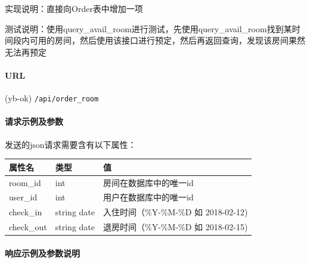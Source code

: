\documentclass[]{article}
\let\oldparagraph\paragraph
\renewcommand{\paragraph}[1]{\oldparagraph{#1}\mbox{}}
\begin{document}
实现说明：直接向Order表中增加一项

测试说明：使用query\_avail\_room进行测试，先使用query\_avail\_room找到某时间段内可用的房间，然后使用该接口进行预定，然后再返回查询，发现该房间果然无法再预定

\hypertarget{url-2}{%
\paragraph{URL}\label{url-2}}

(yb-ok) \texttt{/api/order\_room}

\hypertarget{ux8bf7ux6c42ux793aux4f8bux53caux53c2ux6570-1}{%
\paragraph{请求示例及参数}\label{ux8bf7ux6c42ux793aux4f8bux53caux53c2ux6570-1}}

\begin{Shaded}
\begin{Highlighting}[]
\FunctionTok{\{}
    \FunctionTok{:}\FunctionTok{,}
\FunctionTok{\}}
\end{Highlighting}
\end{Shaded}

发送的json请求需要含有以下属性：

\begin{longtable}[]{@{}lll@{}}
\toprule
属性名 & 类型 & 值\tabularnewline
\midrule
\endhead
room\_id & int & 房间在数据库中的唯一id\tabularnewline
user\_id & int & 用户在数据库中的唯一id\tabularnewline
check\_in & string date & 入住时间（\%Y-\%M-\%D 如
2018-02-12)\tabularnewline
check\_out & string date & 退房时间（\%Y-\%M-\%D 如
2018-02-15)\tabularnewline
\bottomrule
\end{longtable}

\hypertarget{ux54cdux5e94ux793aux4f8bux53caux53c2ux6570ux8bf4ux660e}{%
\paragraph{响应示例及参数说明}\label{ux54cdux5e94ux793aux4f8bux53caux53c2ux6570ux8bf4ux660e}}

\begin{Shaded}
\begin{Highlighting}[]
\FunctionTok{\{}
    \FunctionTok{:}\FunctionTok{,}
    \FunctionTok{:}
\FunctionTok{\}}
\end{Highlighting}
\end{Shaded}
\end{document}
